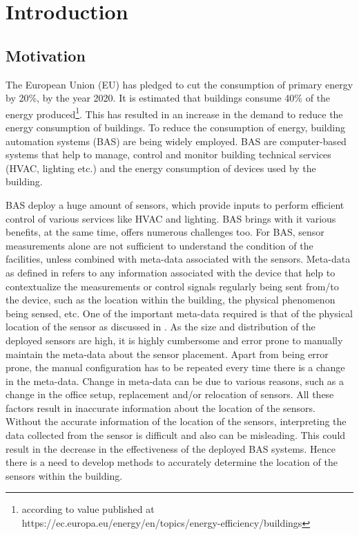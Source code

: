 \chapter{Introduction}
\label{chp:introduction}
\section{Motivation}
The European Union (EU) has pledged to cut the consumption of primary energy by 20\%, by the year 2020.  It is estimated that buildings consume 40\% of the energy produced\footnote{according to value published at https://ec.europa.eu/energy/en/topics/energy-efficiency/buildings }.  This has resulted in an increase in the demand to reduce the energy consumption of buildings. To reduce the consumption of energy, building automation systems (BAS) are being widely employed. BAS are computer-based systems that help to manage, control and monitor building technical services (HVAC, lighting etc.) and the energy consumption of devices used by the building.

 BAS deploy a huge amount of sensors, which provide inputs to perform efficient control of various services like HVAC and lighting. BAS brings with it various benefits, at the same time, offers numerous challenges too. For BAS, sensor measurements alone are not sufficient to understand the condition of the facilities, unless combined with meta-data associated with the sensors.
Meta-data as defined in \cite{gao2015data} refers to any information associated  with the device that help to contextualize the measurements or control signals regularly being sent from/to the device, such as the location within the building, the physical phenomenon being sensed, etc.
 One of the important meta-data required is that of the physical location of the sensor as discussed in  \cite{liu2009requirements}.
As the size and distribution of the deployed sensors are high, it is highly cumbersome and error prone to manually maintain the meta-data about the sensor placement. Apart from being error prone, the manual configuration has to be repeated every time there is a change in the meta-data. Change in meta-data can be due to various reasons, such as a change in the office setup, replacement and/or relocation of sensors. All these factors result in inaccurate information about the location of the sensors. Without the accurate information of the location of the sensors, interpreting the data collected from the sensor is difficult and also can be misleading. This could result in the decrease in the effectiveness of the deployed BAS systems. Hence there is a need to develop methods to accurately determine the location of the sensors within the building.
